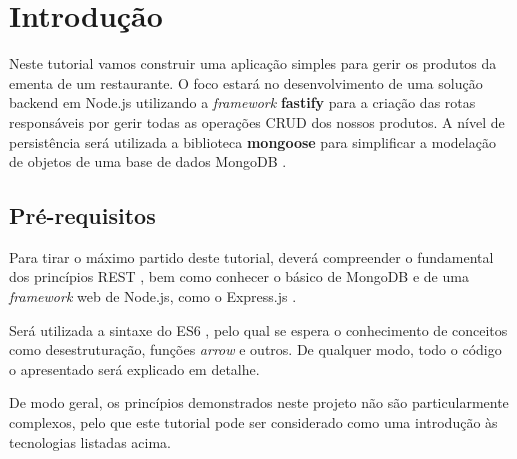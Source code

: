 \section{Introdução} \label{section: introduction}

Neste tutorial vamos construir uma aplicação simples para gerir os produtos da ementa de um restaurante. O foco estará no desenvolvimento de uma solução backend em Node.js \cite{nodejs_nodejs_nodate} utilizando a \textit{framework} \textbf{fastify} \cite{noauthor_fastify_nodate} para a criação das rotas responsáveis por gerir todas as operações CRUD \cite{noauthor_what_nodate} dos nossos produtos. A nível de persistência será utilizada a biblioteca \textbf{mongoose} \cite{noauthor_mongoose_nodate} para simplificar a modelação de objetos de uma base de dados MongoDB \cite{noauthor_mongodb_nodate}.

\subsection{Pré-requisitos}

Para tirar o máximo partido deste tutorial, deverá compreender o fundamental dos princípios REST \cite{noauthor_what_nodate-1}, bem como conhecer o básico de MongoDB e de uma \textit{framework} web de Node.js, como o Express.js \cite{noauthor_express_nodate}.

Será utilizada a sintaxe do ES6 \cite{noauthor_ecmascript_nodate}, pelo qual se espera o conhecimento de conceitos como desestruturação, funções \textit{arrow} e outros. De qualquer modo, todo o código o apresentado será explicado em detalhe.

De modo geral, os princípios demonstrados neste projeto não são particularmente complexos, pelo que este tutorial pode ser considerado como uma introdução às tecnologias listadas acima.
